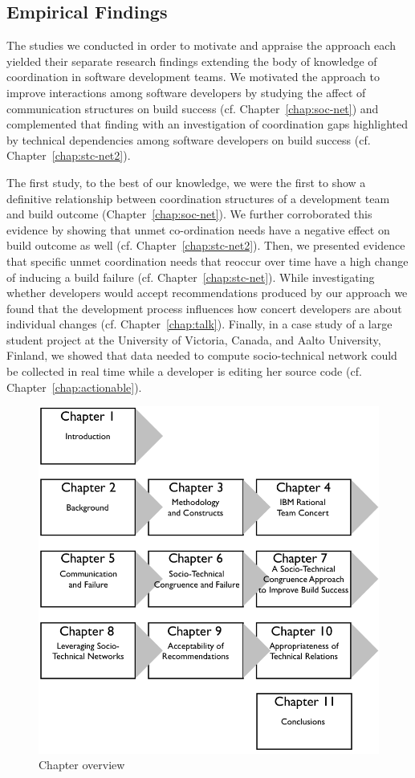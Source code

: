 \subsection{Empirical Findings}
The studies we conducted in order to motivate and appraise the approach each yielded their separate research findings extending the body of knowledge of coordination in software development teams.
We motivated the approach to improve interactions among software developers by studying the affect of communication structures on build success (cf. Chapter~\ref{chap:soc-net}) and complemented that finding with an investigation of coordination gaps highlighted by technical dependencies among software developers on build success (cf. Chapter~\ref{chap:stc-net2}).

The first study, to the best of our knowledge, we were the first to show a definitive relationship between coordination structures of a development team and build outcome (Chapter~\ref{chap:soc-net}).
We further corroborated this evidence by showing that unmet co-ordination needs have a negative effect on build outcome as well (cf. Chapter~\ref{chap:stc-net2}).
Then, we presented evidence that specific unmet coordination needs that reoccur over time have a high change of inducing a build failure (cf. Chapter~\ref{chap:stc-net}).
While investigating whether developers would accept recommendations produced by our approach we found that the development process influences how concert developers are about individual changes (cf. Chapter~\ref{chap:talk}).
Finally, in a case study of a large student project at the University of Victoria, Canada, and Aalto University, Finland, we showed that data needed to compute socio-technical network could be collected in real time while a developer is editing her source code (cf. Chapter~\ref{chap:actionable}).

\begin{figure}[t]
\centering
\includegraphics[width=.9\columnwidth]{figures/dis-over}
\caption{Chapter overview}
\label{fig:over}
\end{figure}

